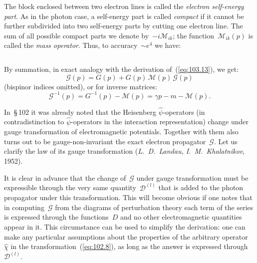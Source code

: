 
The block enclosed between two electron lines is called the \emph{electron self-energy part}. As in the photon case, a self-energy part is called \emph{compact} if it cannot be further subdivided into two self-energy parts by cutting one electron line. The sum of all possible compact parts we denote by~$-i\mathcal{M}_{ik}$; the function~$\mathcal{M}_{ik}(p)$ is called the \emph{mass operator}. Thus, to accuracy~$\sim e^4$ we have:

\begin{equation}
\label{eq:105.5}
\end{equation}

By summation, in exact analogy with the derivation of~(\ref{eq:103.13}), we get:
\begin{equation}
\mathcal{G}(p) = G(p) + G(p)\,\mathcal{M}(p)\,\mathcal{G}(p)
\label{eq:105.6}
\end{equation}
(bispinor indices omitted), or for inverse matrices:
\begin{equation}
\mathcal{G}^{-1}(p) = G^{-1}(p) - \mathcal{M}(p) = \gamma p - m - \mathcal{M}(p).
\label{eq:105.7}
\end{equation}

In~\S\,102 it was already noted that the Heisenberg $\hat{\psi}$-operators (in contradistinction to $\hat{\psi}$-operators in the interaction representation) change under gauge transformation of electromagnetic potentials. Together with them also turns out to be gauge-non-invariant the exact electron propagator~$\mathcal{G}$. Let us clarify the law of its gauge transformation (\emph{L.~D.~Landau, I.~M.~Khalatnikov}, 1952).

It is clear in advance that the change of~$\mathcal{G}$ under gauge transformation must be expressible through the very same quantity~$\mathcal{D}^{(l)}$ that is added to the photon propagator under this transformation. This will become obvious if one notes that in computing~$\mathcal{G}$ from the diagrams of perturbation theory each term of the series is expressed through the functions~$D$ and no other electromagnetic quantities appear in it. This circumstance can be used to simplify the derivation: one can make any particular assumptions about the properties of the arbitrary operator~$\hat{\chi}$ in the transformation~(\ref{eq:102.8}), as long as the answer is expressed through~$\mathcal{D}^{(l)}$.

